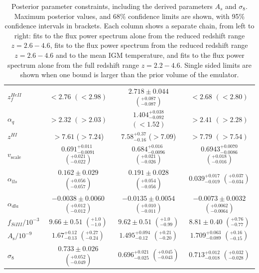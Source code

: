 \begin{table}
\begin{tabular} {| l | c | c | c|}
$z^{HeII}_f     $ & $< 2.76                    $  $(< 2.98)$                   & $2.718\pm 0.044            $  $\left(^{+0.087}_{-0.087}\right)$    & $< 2.68                    $    $(< 2.80 )$   \\
$\alpha_{q}     $ & $> 2.32                    $  $(> 2.03)$                   & $1.404^{+0.038}_{-0.092}   $  $(< 1.52 )$              & $> 2.41                    $    $(> 2.28 )                   $   \\
$z^{HI}         $ & $> 7.61                    $ ($> 7.24 $) & $7.58^{+0.37}_{-0.16}      $ ($> 7.09 $)     & $> 7.79                    $    $(> 7.54 )$   \\
$v_\mathrm{scale}$ & $0.691^{+0.011}_{-0.0091}  $  $\left(^{+0.021}_{-0.022}\right)$    & $0.684^{+0.016}_{-0.0096} $  $\left(^{+0.021}_{-0.026}\right)$    & $0.6943^{+0.0070}_{-0.0086}$  $\left(^{+0.018}_{-0.016} \right)$     \\
$\alpha_{lls}   $ & $0.162\pm 0.029   $ $\left(^{+0.056}_{-0.057}\right)$          & $0.191\pm 0.028            $  $\left(^{+0.054}_{-0.056}\right)   $     & $0.039^{+0.017}_{-0.019}   $  $\left(^{+0.037}_{-0.034}\right)$   \\
$\alpha_{dla}   $ & $-0.0038\pm 0.0060         $ $\left(^{+0.012}_{-0.012}\right)$ & $-0.0135\pm 0.0054         $ $\left(^{+0.010}_{-0.011}\right)  $    & $-0.0073\pm 0.0032         $   $\left(^{+0.0062}_{-0.0064}\right)$  \\
$f_{SiIII}/10^{-3} $ & $9.66\pm 0.51              $ $\left(^{+1.0}_{-1.0}\right)$              & $9.62\pm 0.51        $       $\left(^{+1.0}_{-0.99}\right) $          & $8.81\pm 0.40        $  $\left(^{+0.76}_{-0.77}\right)$\\
\hline
$A_\mathrm{s}/10^{-9}      $ & $1.67^{+0.12}_{-0.13}$ $\left(^{+0.27}_{-0.24}\right)$ & $1.495^{+0.094}_{-0.12}$ $\left(^{+0.21}_{-0.20}\right)$  & $1.709^{+0.063}_{-0.089}$ $\left(^{+0.16}_{-0.15}\right)$   \\
$\sigma_8$ & $0.733\pm 0.026            $ $\left(^{+0.052}_{-0.049}\right)$ &  $0.696^{+0.021}_{-0.025}   $ $\left(^{+0.045}_{-0.043}\right)$ & $0.713^{+0.012}_{-0.018}$  $\left(^{+0.032}_{-0.028}\right)$  \\
\hline
\end{tabular}
\caption{\label{table:parameters}
Posterior parameter constraints, including the derived parameters $A_s$ and $\sigma_8$. Maximum posterior values, and $68\%$ confidence limits are shown, with 95\% confidence intervals in brackets. Each column shows a separate chain, from left to right: fits to the flux power spectrum alone from the reduced redshift range $z=2.6 - 4.6$, fits to the flux power spectrum from the reduced redshift range $z=2.6 - 4.6$ and to the mean IGM temperature, and fits to the flux power spectrum alone from the full redshift range $z=2.2 - 4.6$. Single sided limits are shown when one bound is larger than the prior volume of the emulator.
}
\end{table}

